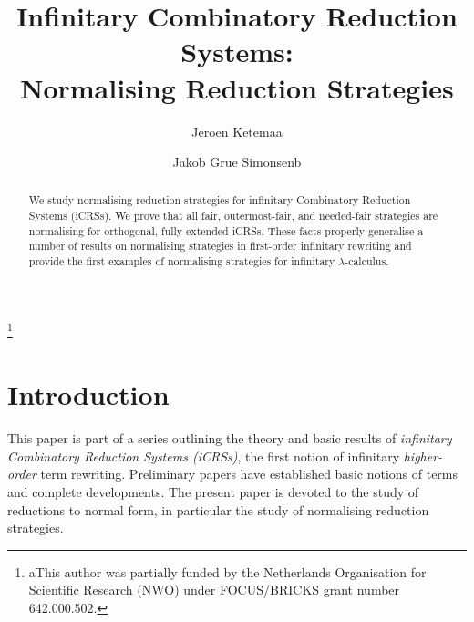 \documentclass{LMCS}
\theoremstyle{definition}
\begin{document}
\title[Infinitary Combinatory Reduction Systems: Normalising Reduction Strategies]{Infinitary Combinatory Reduction Systems: \\
Normalising Reduction Strategies\rsuper*}

\author[J.~Ketema]{Jeroen Ketema\rsuper a}
\address{{\lsuper a}Research Institute of Electrical Communication, Tohoku University\\
2-1-1 Katahira, Aoba-ku, Sendai 980-8577, Japan}
\thanks{{\lsuper a}This author was partially funded by the Netherlands Organisation for Scientific Research (NWO) under FOCUS/BRICKS grant number 642.000.502.}

\author[J.~G.~Simonsen]{Jakob Grue Simonsen\rsuper b}
\address{{\lsuper b}Department of Computer Science, University of Copenhagen (DIKU)\\
Universitetsparken 1, 2100 Copenhagen \O, Denmark}


\begin{abstract}
We study normalising reduction strategies for infinitary Combinatory Reduction Systems (iCRSs). We prove that all fair, outermost-fair, and need\-ed-fair strategies are normalising for orthogonal, fully-extended iCRSs. These facts properly generalise a number of results on normalising strategies in first-order infinitary rewriting and provide the first examples of normalising strategies for infinitary $\lambda$-calculus.

\end{abstract}

\maketitle

\tableofcontents

\section{Introduction}

This paper is part of a series outlining the theory and basic results of \emph{infinitary Combinatory Reduction Systems (iCRSs)}, the first notion of infinitary \emph{higher-order} term rewriting. Preliminary papers \cite{JJ05a,JJ05b} have established basic notions of terms and complete developments. The present paper is devoted to the study of reductions to normal form, in particular the study of normalising reduction strategies.
\end{document}
